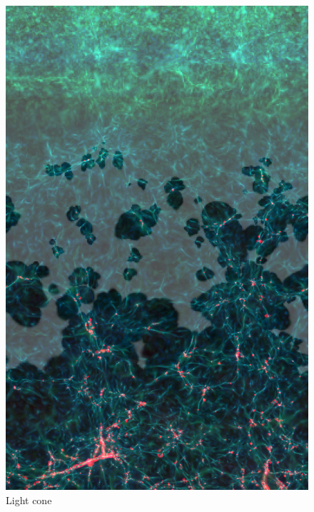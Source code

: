 \begin{figure}[bth]
        \includegraphics[height=.95\textheight]{img/04/frise_wall.png} 
        \caption{Light cone}
 		\label{fig:lightcone}
\end{figure}

